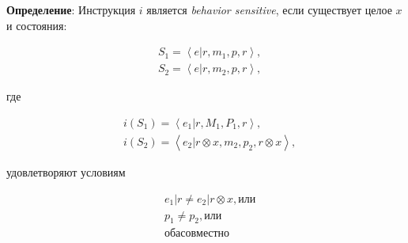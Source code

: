 \textbf{Определение}: Инструкция $i$ является \textit{behavior sensitive}, если существует целое $x$ и состояния:

\begin{equation*}
    \begin{aligned}
        &S_1=\left<e | r, m_1, p, r\right>, \\
        &S_2=\left<e | r, m_2, p, r\right>,
    \end{aligned}
\end{equation*}

где

\begin{equation*}
    \begin{aligned}
        &i(S_1) = \left<e_1 | r, M_1, P_1, r\right>, \\
        &i(S_2) = \left<e_2 | r \otimes x, m_2, p_2, r \otimes x\right>,
    \end{aligned}
\end{equation*}

удовлетворяют условиям

\begin{equation*}
    \begin{aligned}
        &e_1 | r \ne e_2 | r \otimes x, или \\
        &p_1 \ne p_2, или \\
        &оба совместно
    \end{aligned}
\end{equation*}

